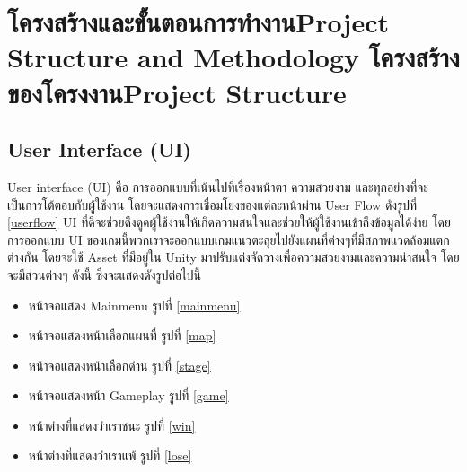 \chapter{\ifproject%
\ifcpe โครงสร้างและขั้นตอนการทำงาน\else Project Structure and Methodology\fi
\else%
\ifcpe โครงสร้างของโครงงาน\else Project Structure\fi
\fi
}


\makeatletter


\makeatother

\section{User Interface (UI)}
User interface (UI) คือ การออกแบบที่เน้นไปที่เรื่องหน้าตา ความสวยงาม และทุกอย่างที่จะเป็นการโต้ตอบกับผู้ใช้งาน โดยจะแสดงการเชื่อมโยงของแต่ละหน้าผ่าน User Flow ดังรูปที่ \ref{userflow} UI ที่ดีจะช่วยดึงดูดผู้ใช้งานให้เกิดความสนใจและช่วยให้ผู้ใช้งานเข้าถึงข้อมูลได้ง่าย
โดยการออกแบบ UI ของเกมนี้พวกเราจะออกแบบเกมแนวตะลุยไปยังแผนที่ต่างๆที่มีสภาพแวดล้อมแตกต่างกัน โดยจะใช้ Asset ที่มีอยู่ใน Unity มาปรับแต่งจัดวางเพื่อความสวยงามและความน่าสนใจ โดยจะมีส่วนต่างๆ ดังนี้ ซึ่งจะแสดงดังรูปต่อไปนี้
\begin{itemize}
\item หน้าจอแสดง Mainmenu รูปที่ \ref{mainmenu}
\item หน้าจอแสดงหน้าเลือกแผนที่ รูปที่ \ref{map}
\item หน้าจอแสดงหน้าเลือกด่าน รูปที่ \ref{stage}
\item หน้าจอแสดงหน้า Gameplay รูปที่ \ref{game}
\item หน้าต่างที่แสดงว่าเราชนะ รูปที่ \ref{win}
\item หน้าต่างที่แสดงว่าเราแพ้ รูปที่ \ref{lose}
\end{itemize}


